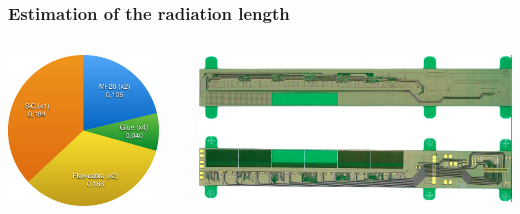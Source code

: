 \documentclass{beamer}
\begin{document}
   \begin{frame}
    \frametitle{Estimation of the radiation length}

    \begin{columns}[c]
      \begin{column}{4cm}
        \centering
        \includegraphics[width = 0.9\textwidth]{Pictures/X0.pdf}
        
      \end{column}
      \begin{column}{5cm}
        \centering
        \includegraphics[width = 1.1\textwidth]{Pictures/flexPCB-2009.jpg}


\end{column}
\end{columns}
\end{frame}
\end{document}
